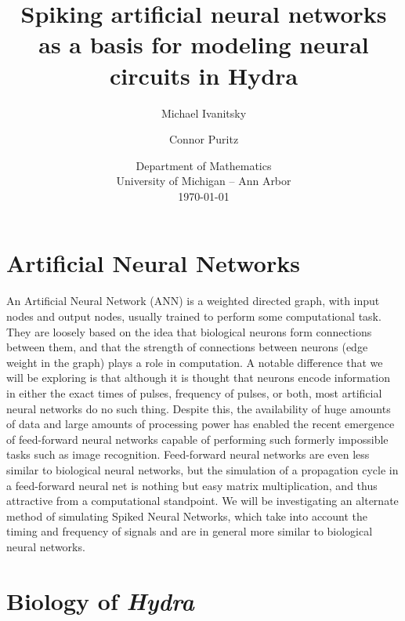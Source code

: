 \documentclass{article}
\begin{document}
\title{Spiking artificial neural networks as a basis for modeling neural circuits in Hydra}

\author{Michael Ivanitsky \and Connor Puritz}
\date{%
    Department of Mathematics\\ University of Michigan -- Ann Arbor\\[2ex]%
    \today
}

\maketitle

\begin{abstract}


\end{abstract}

\section{Artificial Neural Networks}
An Artificial Neural Network (ANN) is a weighted directed graph, with input nodes and output nodes, usually trained to perform some computational task. They are loosely based on the idea that biological neurons form connections between them, and that the strength of connections between neurons (edge weight in the graph) plays a role in computation. A notable difference that we will be exploring is that although it is thought that neurons encode information in either the exact times of pulses, frequency of pulses, or both, most artificial neural networks do no such thing. Despite this, the availability of huge amounts of data and large amounts of processing power has enabled the recent emergence of feed-forward neural networks capable of performing such formerly impossible tasks such as image recognition. Feed-forward neural networks are even less similar to biological neural networks, but the simulation of a propagation cycle in a feed-forward neural net is nothing but easy matrix multiplication, and thus attractive from a computational standpoint. We will be investigating an alternate method of simulating Spiked Neural Networks, which take into account the timing and frequency of signals and are in general more similar to biological neural networks.

\newpage

\section{Biology of \textit{Hydra}}
\end{document}
